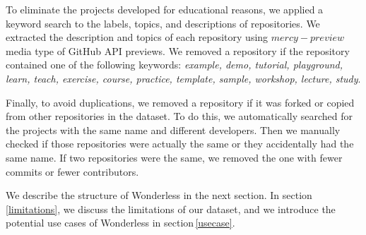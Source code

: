 To eliminate the projects developed for educational reasons, 
we applied a keyword search to the labels, topics, and 
descriptions of repositories. We extracted the description 
and topics of each repository using $mercy-preview$ media 
type of GitHub API previews. We removed a repository 
if the repository contained one of the following keywords: 
\emph{example, demo, tutorial, playground, learn, teach, exercise, 
	course, practice, template, sample, workshop, lecture, study}.

Finally, to avoid duplications, we removed a repository if it was forked 
or copied from other repositories in the dataset. To do this, we automatically 
searched for the projects with the same name and different developers. 
Then we manually checked if those repositories were actually the same or 
they accidentally had the same name. If two repositories were the same, 
we removed the one with fewer commits or fewer contributors.

We describe the structure of Wonderless in the next section. 
In section\,\ref{limitations}, we discuss the limitations of our dataset, 
and we introduce the potential use cases of Wonderless in section\,\ref{usecase}.